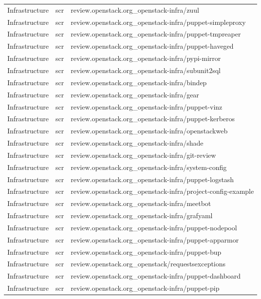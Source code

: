 \begin{center}
\begin{longtable}{|p{4cm}|p{1cm}|p{10cm}|}
Infrastructure&scr&review.openstack.org\_openstack-infra/zuul\\ 
Infrastructure&scr&review.openstack.org\_openstack-infra/puppet-simpleproxy\\ 
Infrastructure&scr&review.openstack.org\_openstack-infra/puppet-tmpreaper\\ 
Infrastructure&scr&review.openstack.org\_openstack-infra/puppet-haveged\\ 
Infrastructure&scr&review.openstack.org\_openstack-infra/pypi-mirror\\ 
Infrastructure&scr&review.openstack.org\_openstack-infra/subunit2sql\\ 
Infrastructure&scr&review.openstack.org\_openstack-infra/bindep\\ 
Infrastructure&scr&review.openstack.org\_openstack-infra/gear\\ 
Infrastructure&scr&review.openstack.org\_openstack-infra/puppet-vinz\\ 
Infrastructure&scr&review.openstack.org\_openstack-infra/puppet-kerberos\\ 
Infrastructure&scr&review.openstack.org\_openstack-infra/openstackweb\\ 
Infrastructure&scr&review.openstack.org\_openstack-infra/shade\\ 
Infrastructure&scr&review.openstack.org\_openstack-infra/git-review\\ 
Infrastructure&scr&review.openstack.org\_openstack-infra/system-config\\ 
Infrastructure&scr&review.openstack.org\_openstack-infra/puppet-logstash\\ 
Infrastructure&scr&review.openstack.org\_openstack-infra/project-config-example\\ 
Infrastructure&scr&review.openstack.org\_openstack-infra/meetbot\\ 
Infrastructure&scr&review.openstack.org\_openstack-infra/grafyaml\\ 
Infrastructure&scr&review.openstack.org\_openstack-infra/puppet-nodepool\\ 
Infrastructure&scr&review.openstack.org\_openstack-infra/puppet-apparmor\\ 
Infrastructure&scr&review.openstack.org\_openstack-infra/puppet-bup\\ 
Infrastructure&scr&review.openstack.org\_openstack/requestsexceptions\\ 
Infrastructure&scr&review.openstack.org\_openstack-infra/puppet-dashboard\\ 
Infrastructure&scr&review.openstack.org\_openstack-infra/puppet-pip\\ 

\end{longtable}
\end{center}
